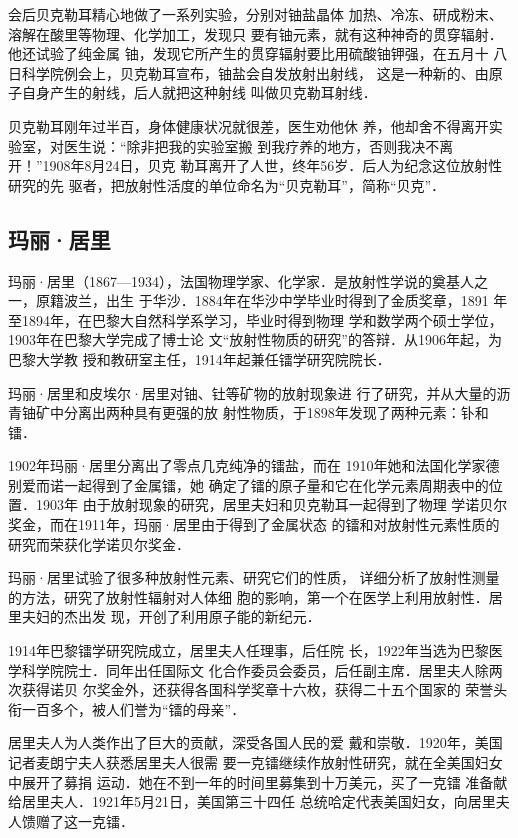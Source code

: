 会后贝克勒耳精心地做了一系列实验，分别对铀盐晶体
加热、冷冻、研成粉末、溶解在酸里等物理、化学加工，发现只
要有铀元素，就有这种神奇的贯穿辐射．他还试验了纯金属
铀，发现它所产生的贯穿辐射要比用硫酸铀钾强，在五月十
八日科学院例会上，贝克勒耳宣布，铀盐会自发放射出射线，
这是一种新的、由原子自身产生的射线，后人就把这种射线
叫做贝克勒耳射线．

贝克勒耳刚年过半百，身体健康状况就很差，医生劝他休
养，他却舍不得离开实验室，对医生说：“除非把我的实验室搬
到我疗养的地方，否则我决不离开！”1908年8月24日，贝克
勒耳离开了人世，终年56岁．后人为纪念这位放射性研究的先
驱者，把放射性活度的单位命名为“贝克勒耳”，简称“贝克”．

\subsection{玛丽·居里}
玛丽·居里（1867—1934），法国物理学家、化学家．是放射性学说的奠基人之一，原籍波兰，出生
于华沙．1884年在华沙中学毕业时得到了金质奖章，1891
年至1894年，在巴黎大自然科学系学习，毕业时得到物理
学和数学两个硕士学位，1903年在巴黎大学完成了博士论
文“放射性物质的研究”的答辩．从1906年起，为巴黎大学教
授和教研室主任，1914年起兼任镭学研究院院长．

玛丽·居里和皮埃尔·居里对铀、钍等矿物的放射现象进
行了研究，并从大量的沥青铀矿中分离出两种具有更强的放
射性物质，于1898年发现了两种元素：钋和镭．

1902年玛丽·居里分离出了零点几克纯净的镭盐，而在
1910年她和法国化学家德别爱而诺一起得到了金属镭，她
确定了镭的原子量和它在化学元素周期表中的位置．1903年
由于放射现象的研究，居里夫妇和贝克勒耳一起得到了物理
学诺贝尔奖金，而在1911年，玛丽·居里由于得到了金属状态
的镭和对放射性元素性质的研究而荣获化学诺贝尔奖金．

玛丽·居里试验了很多种放射性元素、研究它们的性质，
详细分析了放射性测量的方法，研究了放射性辐射对人体细
胞的影响，第一个在医学上利用放射性．居里夫妇的杰出发
现，开创了利用原子能的新纪元．

1914年巴黎镭学研究院成立，居里夫人任理事，后任院
长，1922年当选为巴黎医学科学院院士．同年出任国际文
化合作委员会委员，后任副主席．居里夫人除两次获得诺贝
尔奖金外，还获得各国科学奖章十六枚，获得二十五个国家的
荣誉头衔一百多个，被人们誉为“镭的母亲”．

居里夫人为人类作出了巨大的贡献，深受各国人民的爱
戴和崇敬．1920年，美国记者麦朗宁夫人获悉居里夫人很需
要一克镭继续作放射性研究，就在全美国妇女中展开了募捐
运动．她在不到一年的时间里募集到十万美元，买了一克镭
准备献给居里夫人．1921年5月21日，美国第三十四任
总统哈定代表美国妇女，向居里夫人馈赠了这一克镭．

